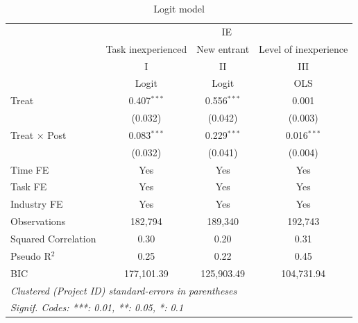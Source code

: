 \documentclass[
]{article}
\begin{document}
\begin{table}[htbp]
   \caption{Logit model}
   \centering
   \small
   \begin{tabular}{lccc}
      \toprule
       & \multicolumn{3}{c}{IE}\\
                           & Task inexperienced & New entrant   & Level of inexperience \\   
                           & I                  & II            & III\\  
                           &  Logit             & Logit         & OLS\\  
      Treat                & 0.407$^{***}$      & 0.556$^{***}$ & 0.001\\   
                           & (0.032)            & (0.042)       & (0.003)\\   
      Treat $\times$ Post  & 0.083$^{***}$      & 0.229$^{***}$ & 0.016$^{***}$\\   
                           & (0.032)            & (0.041)       & (0.004)\\   
      Time FE              & Yes                & Yes           & Yes\\  
      Task FE              & Yes                & Yes           & Yes\\  
      Industry FE          & Yes                & Yes           & Yes\\  
      Observations         & 182,794            & 189,340       & 192,743\\  
      Squared Correlation  & 0.30               & 0.20          & 0.31\\  
      Pseudo R$^2$         & 0.25               & 0.22          & 0.45\\  
      BIC                  & 177,101.39         & 125,903.49    & 104,731.94\\  
      \midrule
      \multicolumn{4}{l}{\emph{Clustered (Project ID) standard-errors in parentheses}}\\
      \multicolumn{4}{l}{\emph{Signif. Codes: ***: 0.01, **: 0.05, *: 0.1}}\\
   \end{tabular}
\end{table}
\begingroup
\centering
\small
\end{document}
